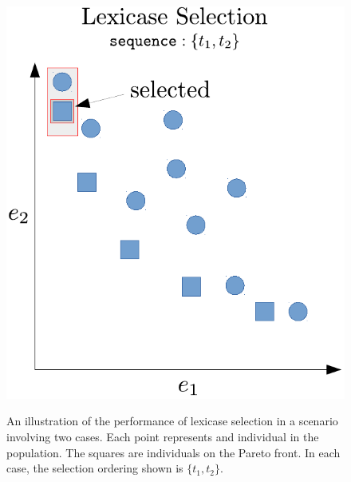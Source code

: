 \documentclass[preprint]{article}
\begin{document}
\begin{figure}

\begin{minipage}{0.49\textwidth}
\centering
  \includegraphics[width = \textwidth]{figs/lex_pareto.pdf}\label{fig:lex_pareto}
  \caption{An illustration of the performance of lexicase selection in a scenario involving two cases. Each point represents and individual in the population. The squares are individuals on the Pareto front. In each case, the selection ordering shown is $\{t_1,t_2\}$. }
\end{minipage}
\begin{minipage}{0.49\textwidth}
\centering

\end{minipage}
\end{figure}
\end{document}
